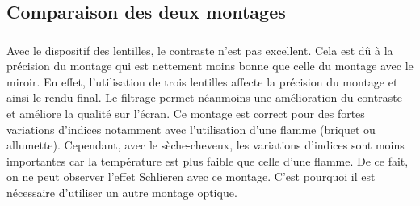 \subsection{Comparaison des deux montages}
\subsubsection{\large{}}
Avec le dispositif des lentilles, le contraste n’est pas excellent. Cela est dû à la précision du montage qui est nettement moins bonne que celle du montage avec le miroir. En effet, l’utilisation de trois lentilles affecte la précision du montage et ainsi le rendu final. Le filtrage permet néanmoins une amélioration du contraste et améliore la qualité sur l’écran. Ce montage est correct pour des fortes variations d’indices notamment avec l’utilisation d’une flamme (briquet ou allumette). Cependant, avec le sèche-cheveux, les variations d’indices sont moins importantes car la température est plus faible que celle d’une flamme. De ce fait, on ne peut observer l’effet Schlieren avec ce montage. C’est pourquoi il est nécessaire d’utiliser un autre montage optique.
